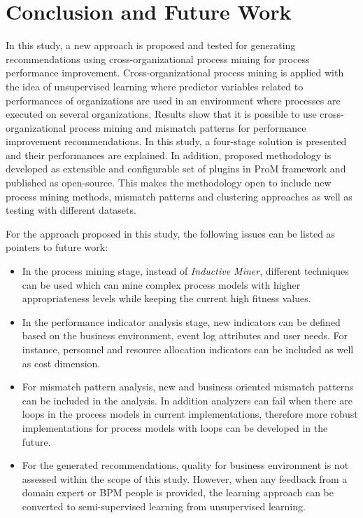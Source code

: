 \section{Conclusion and Future Work}
\label{sec:conclusion-and-future-work}

In this study, a new approach is proposed and tested for generating recommendations using cross-organizational process mining for process performance improvement. Cross-organizational process mining is applied with the idea of unsupervised learning where predictor variables related to performances of organizations are used in an environment where processes are executed on several organizations. Results show that it is possible to use cross-organizational process mining and mismatch patterns for performance improvement recommendations. In this study, a four-stage solution is presented and their performances are explained. In addition, proposed methodology is developed as extensible and configurable set of plugins in ProM framework \cite{verbeek2010prom} and published as open-source. This makes the methodology open to include new process mining methods, mismatch patterns and clustering approaches as well as testing with different datasets.

For the approach proposed in this study, the following issues can be listed as pointers to future work:
\begin{itemize}
	\item In the process mining stage, instead of \textit{Inductive Miner}, different techniques can be used which can mine complex process models with higher appropriateness levels while keeping the current high fitness values.
	\item In the performance indicator analysis stage, new indicators can be defined based on the business environment, event log attributes and user needs. For instance, personnel and resource allocation indicators can be included as well as cost dimension.
	\item For mismatch pattern analysis, new and business oriented mismatch patterns can be included in the analysis. In addition analyzers can fail when there are loops in the process models in current implementations, therefore more robust implementations for process models with loops can be developed in the future.
	\item For the generated recommendations, quality for business environment is not assessed within the scope of this study. However, when any feedback from a domain expert or BPM people is provided, the learning approach can be converted to semi-supervised learning from unsupervised learning.
\end{itemize}